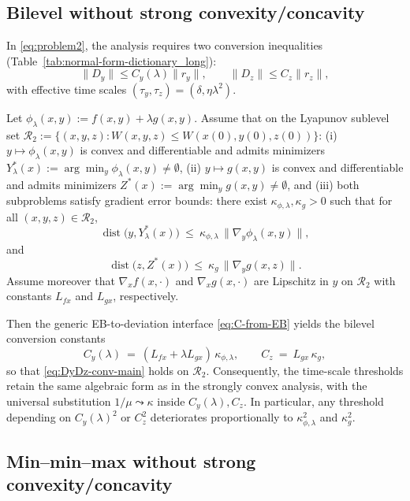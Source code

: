 \documentclass{article}
\newcommand{\1}{\mathbf{1}}
\begin{document}
\subsection{Bilevel without strong convexity/concavity}\label{app:eb-p2}

In \ref{eq:problem2}, the analysis requires two conversion inequalities (Table~\ref{tab:normal-form-dictionary_long}):
\[
\|D_y\|\le C_y(\lambda)\|r_y\|,
\qquad
\|D_z\|\le C_z\|r_z\|,
\]
with effective time scales $(\tau_y,\tau_z)=(\delta,\eta\lambda^2)$.

Let $\phi_\lambda(x,y):=f(x,y)+\lambda g(x,y)$.
Assume that on the Lyapunov sublevel set $\mathcal R_2:=\{(x,y,z): W(x,y,z)\le W(x(0),y(0),z(0))\}$:
(i) $y\mapsto \phi_\lambda(x,y)$ is convex and differentiable and admits minimizers
$Y_\lambda^*(x):=\arg\min_y \phi_\lambda(x,y)\neq\emptyset$,
(ii) $y\mapsto g(x,y)$ is convex and differentiable and admits minimizers
$Z^*(x):=\arg\min_y g(x,y)\neq\emptyset$,
and (iii) both subproblems satisfy gradient error bounds:
there exist $\kappa_{\phi,\lambda},\kappa_g>0$ such that for all $(x,y,z)\in\mathcal R_2$,
\begin{equation}\label{eq:EB-P2-phi}
\operatorname{dist}\bigl(y, Y_\lambda^*(x)\bigr)\ \le\ \kappa_{\phi,\lambda}\,\|\nabla_y\phi_\lambda(x,y)\|,
\end{equation}
and
\begin{equation}\label{eq:EB-P2-g}
\operatorname{dist}\bigl(z, Z^*(x)\bigr)\ \le\ \kappa_{g}\,\|\nabla_y g(x,z)\|.
\end{equation}
Assume moreover that $\nabla_x f(x,\cdot)$ and $\nabla_x g(x,\cdot)$ are Lipschitz in $y$ on $\mathcal R_2$ with constants
$L_{fx}$ and $L_{gx}$, respectively.

Then the generic EB-to-deviation interface \eqref{eq:C-from-EB} yields the bilevel conversion constants
\[
C_y(\lambda)\ =\ (L_{fx}+\lambda L_{gx})\,\kappa_{\phi,\lambda},
\qquad
C_z\ =\ L_{gx}\,\kappa_g,
\]
so that \eqref{eq:DyDz-conv-main} holds on $\mathcal R_2$.
Consequently, the time-scale thresholds retain the same algebraic form as in the strongly convex analysis,
with the universal substitution $1/\mu\leadsto \kappa$ inside $C_y(\lambda),C_z$.
In particular, any threshold depending on $C_y(\lambda)^2$ or $C_z^2$ deteriorates proportionally to
$\kappa_{\phi,\lambda}^2$ and $\kappa_g^2$.

\subsection{Min--min--max without strong convexity/concavity}\label{app:eb-p3}
\end{document}
